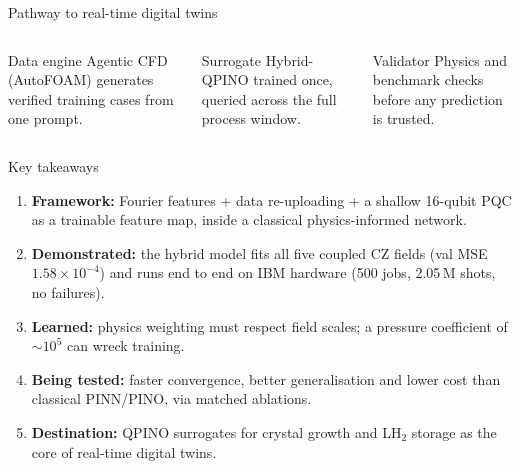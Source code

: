 \documentclass[aspectratio=169]{beamer}
\begin{document}
\begin{frame}{Pathway to real-time digital twins}
\centering
{}

\vspace{0.4cm}
\begin{columns}[T,onlytextwidth]
\begin{block}{Data engine}
\footnotesize Agentic CFD (AutoFOAM) generates verified training cases from one prompt.
\end{block}
\begin{block}{Surrogate}
\footnotesize Hybrid-QPINO trained once, queried across the full process window.
\end{block}
\begin{block}{Validator}
\footnotesize Physics and benchmark checks before any prediction is trusted.
\end{block}
\end{columns}
\end{frame}

\begin{frame}{Key takeaways}
\begin{enumerate}\setlength{\itemsep}{5pt}
  \item \textbf{Framework:} Fourier features + data re-uploading + a shallow 16-qubit PQC as a trainable feature map, inside a classical physics-informed network.
  \item \textbf{Demonstrated:} the hybrid model fits all five coupled CZ fields (val MSE $1.58\times10^{-4}$) and runs end to end on IBM hardware (500 jobs, 2.05\,M shots, no failures).
  \item \textbf{Learned:} physics weighting must respect field scales; a pressure coefficient of $\sim\!10^5$ can wreck training.
  \item \textbf{Being tested:} faster convergence, better generalisation and lower cost than classical PINN/PINO, via matched ablations.
  \item \textbf{Destination:} QPINO surrogates for crystal growth and LH$_2$ storage as the core of real-time digital twins.
\end{enumerate}
\end{frame}
\end{document}

